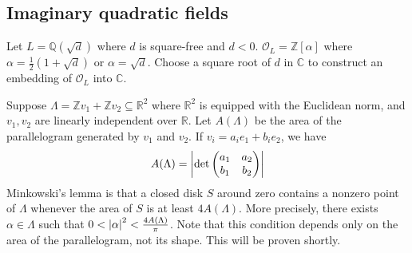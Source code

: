 \subsection{Imaginary quadratic fields}
Let \( L = \mathbb Q(\sqrt{d}) \) where \( d \) is square-free and \( d < 0 \).
\( \mathcal O_L = \mathbb Z[\alpha] \) where \( \alpha = \frac{1}{2}(1+\sqrt{d}) \) or \( \alpha = \sqrt{d} \).
Choose a square root of \( d \) in \( \mathbb C \) to construct an embedding of \( \mathcal O_L \) into \( \mathbb C \).

Suppose \( \Lambda = \mathbb Z v_1 + \mathbb Z v_2 \subseteq \mathbb R^2 \) where \( \mathbb R^2 \) is equipped with the Euclidean norm, and \( v_1, v_2 \) are linearly independent over \( \mathbb R \).
Let \( A(\Lambda) \) be the area of the parallelogram generated by \( v_1 \) and \( v_2 \).
If \( v_i = a_i e_1 + b_i e_2 \), we have
\[ A(\Lambda) = \abs{\det \begin{pmatrix}
    a_1 & a_2 \\
    b_1 & b_2
\end{pmatrix}} \]
Minkowski's lemma is that a closed disk \( S \) around zero contains a nonzero point of \( \Lambda \) whenever the area of \( S \) is at least \( 4A(\Lambda) \).
More precisely, there exists \( \alpha \in \Lambda \) such that \( 0 < \abs{\alpha}^2 < \frac{4A(\Lambda)}{\pi} \).
Note that this condition depends only on the area of the parallelogram, not its shape.
This will be proven shortly.

